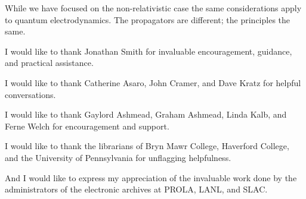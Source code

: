 \documentclass[aps,prl,superscriptaddress,12pt]{revtex4-2}
\begin{document}
While we have focused on the non-relativistic case the same considerations apply to quantum electrodynamics. 
The propagators are different; the principles the same.


\begin{acknowledgments}

I would like to thank Jonathan Smith for invaluable encouragement, guidance, and practical assistance.

I would like to thank Catherine Asaro, John Cramer, and Dave Kratz for helpful conversations.

I would like to thank Gaylord Ashmead, Graham Ashmead, Linda Kalb, and Ferne Welch for encouragement and support.

I would like to thank the librarians of Bryn Mawr College, Haverford College, and the University of Pennsylvania for unflagging helpfulness.

And I would like to express my appreciation of the invaluable work done by the administrators of the electronic archives at PROLA, LANL, and SLAC.

\end{acknowledgments}


\end{document}
